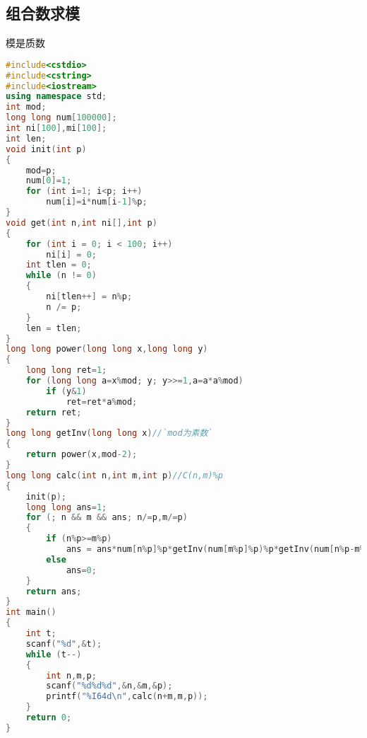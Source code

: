 \subsection{组合数求模}
    模是质数
    \begin{lstlisting}[language=c++]
#include<cstdio>
#include<cstring>
#include<iostream>
using namespace std;
int mod;
long long num[100000];
int ni[100],mi[100];
int len;
void init(int p)
{
    mod=p;
    num[0]=1;
    for (int i=1; i<p; i++)
        num[i]=i*num[i-1]%p;
}
void get(int n,int ni[],int p)
{
    for (int i = 0; i < 100; i++)
        ni[i] = 0;
    int tlen = 0;
    while (n != 0)
    {
        ni[tlen++] = n%p;
        n /= p;
    }
    len = tlen;
}
long long power(long long x,long long y)
{
    long long ret=1;
    for (long long a=x%mod; y; y>>=1,a=a*a%mod)
        if (y&1)
            ret=ret*a%mod;
    return ret;
}
long long getInv(long long x)//`mod为素数`
{
    return power(x,mod-2);
}
long long calc(int n,int m,int p)//C(n,m)%p
{
    init(p);
    long long ans=1;
    for (; n && m && ans; n/=p,m/=p)
    {
        if (n%p>=m%p)
            ans = ans*num[n%p]%p*getInv(num[m%p]%p)%p*getInv(num[n%p-m%p])%p;
        else
            ans=0;
    }
    return ans;
}
int main()
{
    int t;
    scanf("%d",&t);
    while (t--)
    {
        int n,m,p;
        scanf("%d%d%d",&n,&m,&p);
        printf("%I64d\n",calc(n+m,m,p));
    }
    return 0;
}
    \end{lstlisting}
